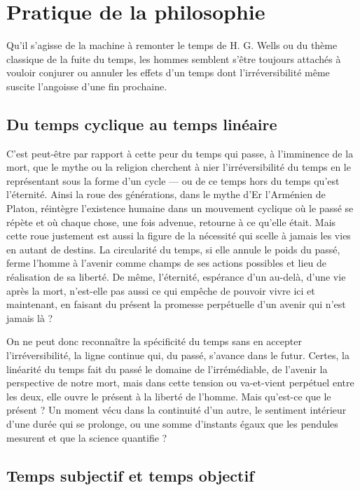 
\section{Pratique de la philosophie}

Qu'il s'agisse de la machine à remonter le temps de H. G. Wells ou du thème classique de la fuite du temps, les hommes semblent s'être toujours attachés à vouloir conjurer ou annuler les effets d'un temps dont l'irréversibilité même suscite l'angoisse d'une fin prochaine.

\subsection{Du temps cyclique au temps linéaire}

C'est peut-être par rapport à cette peur du temps qui passe, à l'imminence de la mort, que le mythe ou la religion cherchent à nier l'irréversibilité du temps en le représentant sous la forme d'un cycle — ou de ce temps hors du temps qu'est l'éternité. Ainsi la roue des générations, dans le mythe d'Er l'Arménien de Platon, réintègre l'existence humaine dans un mouvement cyclique où le passé se répète et où chaque chose, une fois advenue, retourne à ce qu'elle était. Mais cette roue justement est aussi la figure de la nécessité qui scelle à jamais les vies en autant de destins. La circularité du temps, si elle annule le poids du passé, ferme l'homme à l'avenir comme champs de ses actions possibles et lieu de réalisation de sa liberté. De même, l'éternité, espérance d'un au-delà, d'une vie après la mort, n'est-elle pas aussi ce qui empêche de pouvoir vivre ici et maintenant, en faisant du présent la promesse perpétuelle d'un avenir qui n'est jamais là ?

On ne peut donc reconnaître la spécificité du temps sans en accepter l'irréversibilité, la ligne continue qui, du passé, s'avance dans le futur. Certes, la linéarité du temps fait du passé le domaine de l'irrémédiable, de l'avenir la perspective de notre mort, mais dans cette tension ou va-et-vient perpétuel entre les deux, elle ouvre le présent à la liberté de l'homme. Mais qu'est-ce que le présent ? Un moment vécu dans la continuité d'un autre, le sentiment intérieur d'une durée qui se prolonge, ou une somme d'instants égaux que les pendules mesurent et que la science quantifie ?

\subsection{Temps subjectif et temps objectif}

